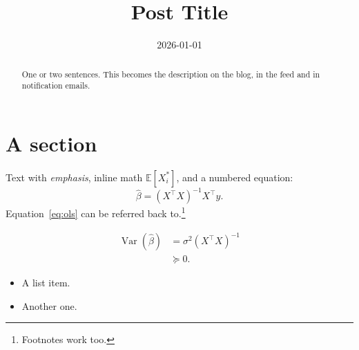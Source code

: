 \documentclass{article}
\title{Post Title}
\date{2026-01-01} %
\newcommand{\E}{\mathbb{E}}
\begin{document}
\begin{abstract}
One or two sentences. This becomes the description on the blog, in the feed and in notification emails.
\end{abstract}

\section{A section}

Text with \emph{emphasis}, inline math $\E[X_i^*]$, and a numbered equation:
\begin{equation}\label{eq:ols}
  \hat\beta = (X^\top X)^{-1} X^\top y.
\end{equation}
Equation~\eqref{eq:ols} can be referred back to.\footnote{Footnotes work too.}

\begin{align*}
  \operatorname{Var}(\hat\beta) &= \sigma^2 (X^\top X)^{-1} \\
                                &\succeq 0.
\end{align*}

\begin{itemize}
  \item A list item.
  \item Another one.
\end{itemize}

\end{document}
